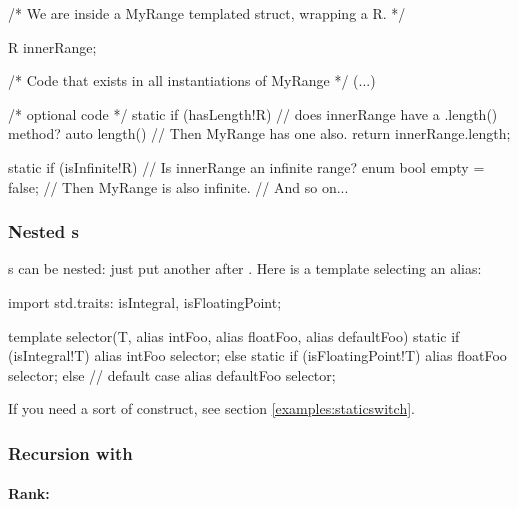 \begin{dcode}
/* We are inside a MyRange templated struct, wrapping a R. */

    R innerRange;

/* Code that exists in all instantiations of MyRange */
(...)

/* optional code */
static if (hasLength!R) // does innerRange have a .length() method?
    auto length()       // Then MyRange has one also.
    {
        return innerRange.length;
    }

static if (isInfinite!R)     // Is innerRange an infinite range?
    enum bool empty = false; // Then MyRange is also infinite.
// And so on...
\end{dcode}

\subsubsection{\texorpdfstring{Nested s}
                              {Nested static ifs}}

s can be nested: just put another  after . Here is a template selecting an alias:

\begin{dcode}
import std.traits: isIntegral, isFloatingPoint;

template selector(T, alias intFoo, alias floatFoo, alias defaultFoo)
{
    static if (isIntegral!T)
       alias intFoo selector;
    else static if (isFloatingPoint!T)
       alias floatFoo selector; 
    else // default case
        alias defaultFoo selector;
}
\end{dcode}

If you need a sort of  construct, see section \ref{examples:staticswitch}.

\subsubsection{\texorpdfstring{Recursion with }
                              {Recursion with static if}}
\label{staticifrecursion}

\paragraph{Rank:}\label{rank}

